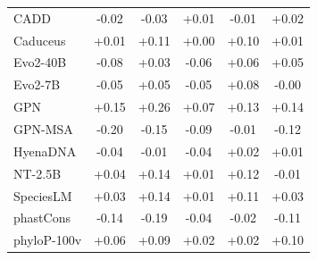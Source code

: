 \documentclass[11pt]{article}
\begin{document}
\begin{table}[h]
\begin{tabular}{lccccc}
\quad CADD & -0.02 & -0.03 & +0.01 & -0.01 & +0.02 \\
\quad Caduceus & +0.01 & +0.11 & +0.00 & +0.10 & +0.01 \\
\quad Evo2-40B & -0.08 & +0.03 & -0.06 & +0.06 & +0.05 \\
\quad Evo2-7B & -0.05 & +0.05 & -0.05 & +0.08 & -0.00 \\
\quad GPN & +0.15 & +0.26 & +0.07 & +0.13 & +0.14 \\
\quad GPN-MSA & -0.20 & -0.15 & -0.09 & -0.01 & -0.12 \\
\quad HyenaDNA & -0.04 & -0.01 & -0.04 & +0.02 & +0.01 \\
\quad NT-2.5B & +0.04 & +0.14 & +0.01 & +0.12 & -0.01 \\
\quad SpeciesLM & +0.03 & +0.14 & +0.01 & +0.11 & +0.03 \\
\quad phastCons & -0.14 & -0.19 & -0.04 & -0.02 & -0.11 \\
\quad phyloP-100v & +0.06 & +0.09 & +0.02 & +0.02 & +0.10 \\
\bottomrule
\end{tabular}
\end{table}
\end{document}
